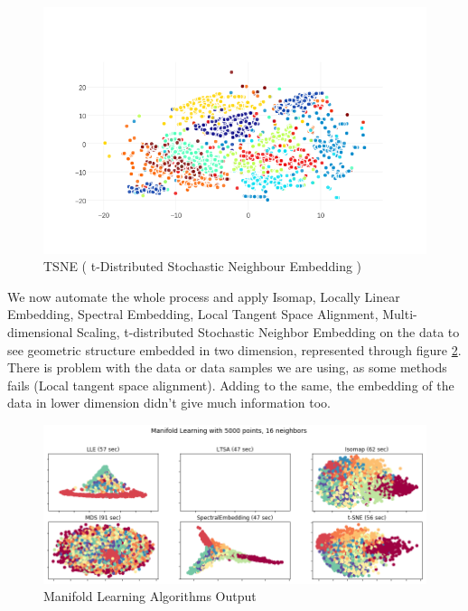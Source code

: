 \begin{figure}[h!]
\begin{center}
\includegraphics[width=\textwidth]{./Figures/tsne.png}
\caption {TSNE ( t-Distributed Stochastic Neighbour Embedding )}
\label{tsne} 
\end{center}
\end{figure}

We now automate the whole process and apply Isomap, Locally Linear Embedding, Spectral Embedding, Local Tangent Space Alignment, Multi-dimensional Scaling, t-distributed Stochastic Neighbor Embedding on the data to see geometric structure embedded in two dimension, represented through figure \ref{AML}. There is problem with the data or data samples we are using, as some methods fails (Local tangent space alignment). Adding to the same, the embedding of the data in lower dimension didn't give much information too.

\begin{figure}[h!]
\begin{center}
\includegraphics[width=\textwidth]{./Figures/AML.png}
\caption {Manifold Learning Algorithms Output}
\label{AML} 
\end{center}
\end{figure}

